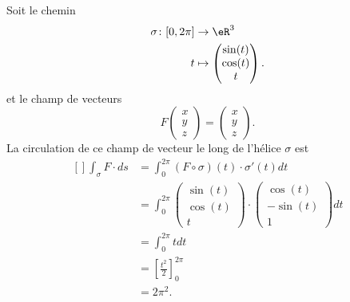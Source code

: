 \begin{example}
	Soit le chemin
	\begin{equation}
		\begin{aligned}
			\sigma\colon \mathopen[ 0 , 2\pi \mathclose] & \to \eR^3              \\
			t                                            & \mapsto \begin{pmatrix}
				                                                       \sin(t) \\
				                                                       \cos(t) \\
				                                                       t
			                                                       \end{pmatrix}.
		\end{aligned}
	\end{equation}
	et le champ de vecteurs
	\begin{equation}
		F\begin{pmatrix}
			x \\
			y \\
			z
		\end{pmatrix}=\begin{pmatrix}
			x \\
			y \\
			z
		\end{pmatrix}.
	\end{equation}
	La circulation de ce champ de vecteur le long de l'hélice \( \sigma\) est
	\begin{equation}
		\begin{aligned}[]
			\int_{\sigma}F\cdot ds & =\int_0^{2\pi}(F\circ \sigma)(t)\cdot \sigma'(t)dt \\
			                       & =\int_0^{2\pi}\begin{pmatrix}
				                                       \sin(t) \\
				                                       \cos(t) \\
				                                       t
			                                       \end{pmatrix}\cdot
			\begin{pmatrix}
				\cos(t)  \\
				-\sin(t) \\
				1
			\end{pmatrix}dt                                                             \\
			                       & =\int_0^{2\pi}tdt                                  \\
			                       & =\left[ \frac{ t^2 }{2} \right]_0^{2\pi}           \\
			                       & =2\pi^2.
		\end{aligned}
	\end{equation}

\end{example}

